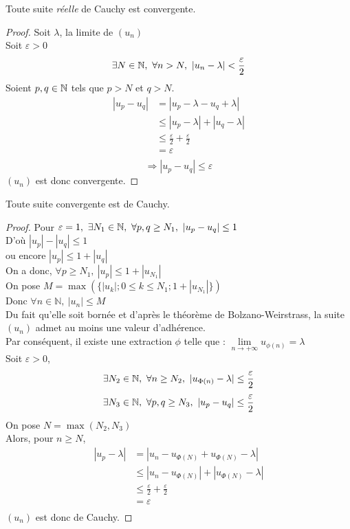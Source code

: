 \documentclass[../main.tex]{subfile}
\begin{document}
\begin{theo}
	Toute suite \emph{réelle} de Cauchy est convergente.
\end{theo}

\begin{proof}
	Soit $\lambda$, la limite de $(u_n)$\\
	Soit $\varepsilon > 0$\\
	$$\exists N \in \NN, \ \forall n > N, \ |u_n - \lambda| < \frac{\varepsilon}{2}$$
	Soient $p, q \in \mathbb{N}$ tels que $p>N$ et $q>N$.\\
	\[
	\begin{aligned}
		|u_p -u_q| &= |u_p - \lambda - u_q + \lambda|\\
		& \leq |u_p - \lambda| + |u_q - \lambda|\\
		& \leq \frac{\varepsilon}{2} + \frac{\varepsilon}{2}\\
		& = \varepsilon\\
	\end{aligned}
	\]
	$$\Rightarrow |u_p - u_q| \leq \varepsilon$$
	$(u_n)$ est donc convergente.
\end{proof}

\begin{theo}
	Toute suite convergente est de Cauchy.
\end{theo}

\begin{proof}
	Pour $\varepsilon = 1 , \ \exists N_1 \in \NN, \ \forall p, q \geq N_1, \ |u_p - u_q| \leq 1$\\
	D'où $|u_p| - |u_q| \leq 1$\\
	ou encore $|u_p| \leq 1 + |u_q|$\\
	On a donc, $\forall p \geq N_1, \ |u_p| \leq 1 + |u_{N_1}|$\\
	On pose $M = \max(\{|u_k|; 0 \leq k \leq N_1 ; 1 + |u_{N_1}|\})$\\
	Donc $\forall n \in \mathbb{N}, \ |u_n| \leq M$\\
	Du fait qu'elle soit bornée et d'après le théorème de Bolzano-Weirstrass, la suite $(u_n)$ admet au moins une valeur d'adhérence.\\
	Par conséquent, il existe une extraction $\phi$ telle que : $\lim\limits_{n \to + \infty} u_{\phi(n)} = \lambda$\\
	Soit $\varepsilon> 0$, \\
	$$\exists N_2 \in \mathbb{N}, \ \forall n \geq N_2, \ |u_{\Phi(n)} - \lambda| \leq \frac{\varepsilon}{2}$$
	$$\exists N_3 \in \NN, \ \forall p, q \geq N_3, \ |u_p - u_q| \leq \frac{\varepsilon}{2}$$
	On pose $N = \max(N_2, N_3)$\\
	Alors, pour $n \geq N$,\\
	\[
	\begin{aligned}
		|u_p - \lambda| &= |u_n - u_{\Phi(N)} + u_{\Phi(N)} - \lambda|\\
		& \leq |u_n - u_{\Phi(N)}| + |u_{\Phi(N)} - \lambda|\\
		& \leq \frac{\varepsilon}{2} + \frac{\varepsilon}{2}\\
		& = \varepsilon\\
	\end{aligned}
	\]
	$(u_n)$ est donc de Cauchy.
\end{proof}
\end{document}

